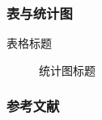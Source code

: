 \documentclass[
    aspectratio=169,                   %
]{beamer}
\begin{document}
    \begin{frame}
        \frametitle{表与统计图}
        \begin{multicols}{2}
        \begin{table}
            \caption{表格标题\cite{pgfplotstableman}}
        \end{table}
        
        \begin{figure}
            
            \caption{统计图标题\cite{pgfplotsman}}
        \end{figure}
        \end{multicols}
    \end{frame}

\appendix

    \begin{frame}
        \frametitle{参考文献}
        \printbibliography[title=参考文献]
    \end{frame}

    \makebottom     %
\end{document}

